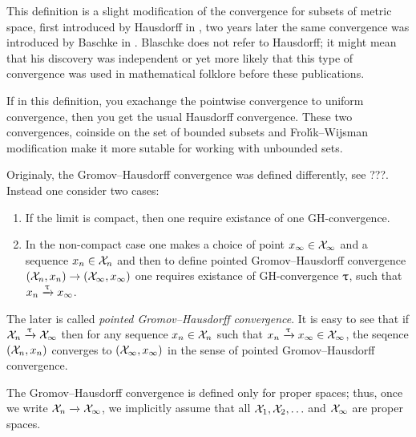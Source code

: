 This definition is a slight modification of the convergence for subsets of metric space,
first introduced by Hausdorff in \cite{hausdorff}%
, two years later the same convergence was introduced by Baschke in \cite{blaschke}%
. 
Blaschke does not refer to Hausdorff; it might mean that his discovery was independent 
or yet more likely that this type of convergence was used in mathematical folklore before these publications. 

If in this definition, 
you exachange the pointwise convergence to uniform convergence,
then you get the usual Hausdorff convergence.
These two convergences, coinside on the 
set of bounded subsets
and Frol\'{\i}k--Wijsman modification make it more sutable for working with unbounded sets.

Originaly, the Gromov--Hausdorff convergence was defined differently, see ???.
Instead one consider two cases: 
\begin{enumerate}
\item If the limit is compact, then one require existance of one GH-convergence.
\item In the non-compact case one makes a choice of point $x_\infty\in\spc{X}_\infty$ and a sequence $x_n\in\spc{X}_n$ and then to define pointed Gromov--Hausdorff convergence $(\spc{X}_n,x_n)\to (\spc{X}_\infty, x_\infty)$ one requires existance of GH-convergence $\uptau$, such that $x_n\xrightarrow{\uptau}x_\infty$.
\end{enumerate}
The later is called \emph{pointed Gromov--Hausdorff convergence}.
It is easy to see that if $\mathcal{X}_n\xrightarrow{\uptau}\mathcal{X}_\infty$ then for any sequence $x_n\in\spc{X}_n$ 
such that $x_n\xto{\GH} x_\infty\in\spc{X}_\infty$, 
the seqence $(\mathcal{X}_n,x_n)$ 
converges to $(\mathcal{X}_\infty,x_\infty)$ 
in the sense of pointed Gromov--Hausdorff convergence.

The Gromov--Hausdorff convergence is defined only for proper spaces;
thus, once we write $\mathcal{X}_n\xrightarrow{}\mathcal{X}_\infty$, 
we implicitly assume that all $\spc{X}_1,\spc{X}_2,\dots$ and $\mathcal{X}_\infty$ are proper spaces.


